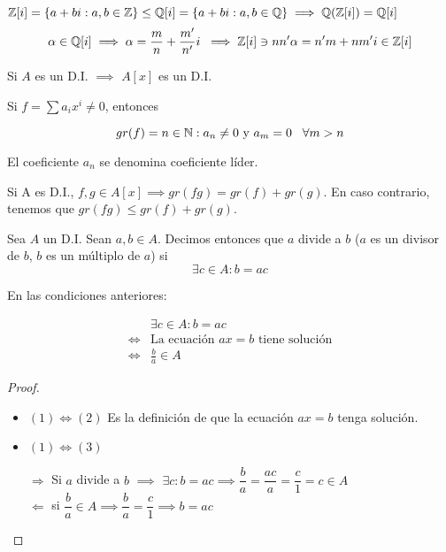\begin{ejemplo}
  $\mathbb{Z}[i] = \{a+bi : a,b\in \mathbb{Z}\} \le \mathbb{Q}[i] = \{a+bi : a,b\in \mathbb{Q}\} \implies \mathbb{Q}(\mathbb{Z}[i]) = \mathbb{Q}[i]$
  \[
    \alpha\in\mathbb{Q}[i]\implies\alpha=\frac{m}{n}+\frac{m'}{n'}i\; \implies \mathbb{Z}[i] \ni nn'\alpha = n'm+nm'i \in \mathbb{Z}[i]\notag
  \]
\end{ejemplo}

\begin{nprop}
	Si $A$ es un D.I. $\implies$ $A[x]$ es un D.I.
\end{nprop}

\begin{ndef}

  Si $f=\sum a_i x^i \neq 0$, entonces

  $$gr(f)=n\in \mathbb{N} : a_n\neq 0 \text{ y } a_m=0 \hspace{0.3cm} \forall m>n$$

El coeficiente $a_n$ se denomina coeficiente líder.

\end{ndef}

\begin{nprop}
	Si A es D.I., $f,g \in A[x]\implies gr(fg) = gr(f)+gr(g)$.
	En caso contrario, tenemos que $gr(fg) \le gr(f)+gr(g)$.
\end{nprop}

\begin{ndef}[Divisibilidad en D.I.]

Sea $A$ un D.I. Sean $a,b\in A$. Decimos entonces que $a$ divide a $b$ ($a$ es un divisor de $b$, $b$ es un múltiplo de $a$) si
\[
	\exists c \in A : b = ac
\]
\end{ndef}

\begin{nprop}
  En las condiciones anteriores:

\begin{align}
	&\exists c \in A : b = ac
\\
	\iff& \text{La ecuación } ax=b \text{ tiene solución}
\\
\iff& \frac{b}{a} \in A
\end{align}
\end{nprop}

\begin{proof}\hfill\\
  \begin{itemize}
  \item $\boxed{(1) \iff (2)}$ Es la definición de que la ecuación $ax = b$ tenga solución.
  \item $\boxed{(1) \iff (3)}$

    $\boxed{\Longrightarrow}$ Si $a$ divide a $b$ $\implies$ $\exists c: b=ac \implies \dfrac{b}{a} = \dfrac{ac}{a} = \dfrac{c}{1} = c \in A$\\
    $\boxed{\Longleftarrow}$ si $\dfrac{b}{a}\in A \implies \dfrac{b}{a} = \dfrac{c}{1} \implies b = ac$
  \end{itemize}

\end{proof}

